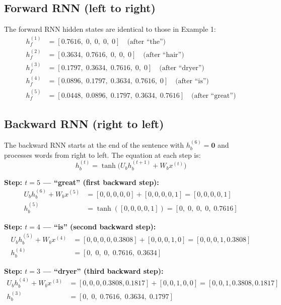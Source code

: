 \subsection{Forward RNN (left to right)}

The forward RNN hidden states are identical to those in Example 1:
\begin{align*}
    h_f^{(1)} &= [0.7616,\; 0,\; 0,\; 0,\; 0] \quad \text{(after ``the'')} \\
    h_f^{(2)} &= [0.3634,\; 0.7616,\; 0,\; 0,\; 0] \quad \text{(after ``hair'')} \\
    h_f^{(3)} &= [0.1797,\; 0.3634,\; 0.7616,\; 0,\; 0] \quad \text{(after ``dryer'')} \\
    h_f^{(4)} &= [0.0896,\; 0.1797,\; 0.3634,\; 0.7616,\; 0] \quad \text{(after ``is'')} \\
    h_f^{(5)} &= [0.0448,\; 0.0896,\; 0.1797,\; 0.3634,\; 0.7616] \quad \text{(after ``great'')}
\end{align*}

\subsection{Backward RNN (right to left)}

The backward RNN starts at the end of the sentence with $h_b^{(6)} = \mathbf{0}$ and
processes words from right to left. The equation at each step is:
\begin{equation}
    h_b^{(t)} = \tanh\!\bigl(U_b h_b^{(t+1)} + W_b x^{(t)}\bigr)
\end{equation}

\textbf{Step: $t=5$ --- ``great'' (first backward step):}
\begin{align*}
    U_b h_b^{(6)} + W_b x^{(5)} &= [0,0,0,0,0] + [0,0,0,0,1] = [0,0,0,0,1] \\
    h_b^{(5)} &= \tanh([0,0,0,0,1]) = [0,\; 0,\; 0,\; 0,\; 0.7616]
\end{align*}

\textbf{Step: $t=4$ --- ``is'' (second backward step):}
\begin{align*}
    U_b h_b^{(5)} + W_b x^{(4)} &= [0,0,0,0,0.3808] + [0,0,0,1,0] = [0,0,0,1,0.3808] \\
    h_b^{(4)} &= [0,\; 0,\; 0,\; 0.7616,\; 0.3634]
\end{align*}

\textbf{Step: $t=3$ --- ``dryer'' (third backward step):}
\begin{align*}
    U_b h_b^{(4)} + W_b x^{(3)} &= [0,0,0,0.3808,0.1817] + [0,0,1,0,0] = [0,0,1,0.3808,0.1817] \\
    h_b^{(3)} &= [0,\; 0,\; 0.7616,\; 0.3634,\; 0.1797]
\end{align*}

